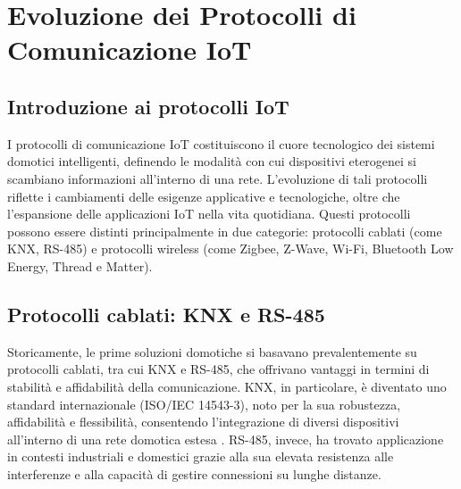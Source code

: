\chapter{Evoluzione dei Protocolli di Comunicazione IoT}

\section{Introduzione ai protocolli IoT}
I protocolli di comunicazione IoT costituiscono il cuore tecnologico dei sistemi domotici intelligenti, definendo le modalità con cui dispositivi eterogenei si scambiano informazioni all'interno di una rete. L'evoluzione di tali protocolli riflette i cambiamenti delle esigenze applicative e tecnologiche, oltre che l'espansione delle applicazioni IoT nella vita quotidiana. Questi protocolli possono essere distinti principalmente in due categorie: protocolli cablati (come KNX, RS-485) e protocolli wireless (come Zigbee, Z-Wave, Wi-Fi, Bluetooth Low Energy, Thread e Matter).

\section{Protocolli cablati: KNX e RS-485}
Storicamente, le prime soluzioni domotiche si basavano prevalentemente su protocolli cablati, tra cui KNX e RS-485, che offrivano vantaggi in termini di stabilità e affidabilità della comunicazione. KNX, in particolare, è diventato uno standard internazionale (ISO/IEC 14543-3), noto per la sua robustezza, affidabilità e flessibilità, consentendo l'integrazione di diversi dispositivi all'interno di una rete domotica estesa \parencite{knxStandard}. RS-485, invece, ha trovato applicazione in contesti industriali e domestici grazie alla sua elevata resistenza alle interferenze e alla capacità di gestire connessioni su lunghe distanze.

